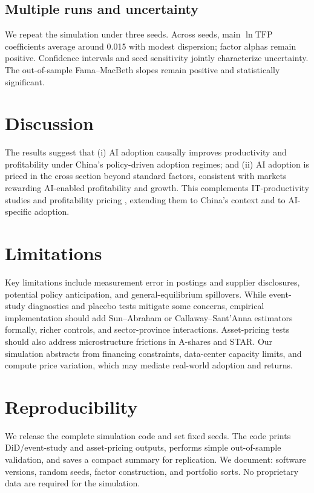 \subsection{Multiple runs and uncertainty}
We repeat the simulation under three seeds. Across seeds, main $\ln \mathrm{TFP}$ coefficients average around 0.015 with modest dispersion; factor alphas remain positive. Confidence intervals and seed sensitivity jointly characterize uncertainty. The out-of-sample Fama–MacBeth slopes remain positive and statistically significant.

\section{Discussion}
The results suggest that (i) AI adoption causally improves productivity and profitability under China’s policy-driven adoption regimes; and (ii) AI adoption is priced in the cross section beyond standard factors, consistent with markets rewarding AI-enabled profitability and growth. This complements IT-productivity studies \citep{BrynjolfssonHitt2000, Bloom2012} and profitability pricing \citep{NovyMarx2013}, extending them to China’s context and to AI-specific adoption.

\section{Limitations}
Key limitations include measurement error in postings and supplier disclosures, potential policy anticipation, and general-equilibrium spillovers. While event-study diagnostics and placebo tests mitigate some concerns, empirical implementation should add Sun–Abraham or Callaway–Sant’Anna estimators formally, richer controls, and sector-province interactions. Asset-pricing tests should also address microstructure frictions in A-shares and STAR. Our simulation abstracts from financing constraints, data-center capacity limits, and compute price variation, which may mediate real-world adoption and returns.

\section{Reproducibility}
We release the complete simulation code and set fixed seeds. The code prints DiD/event-study and asset-pricing outputs, performs simple out-of-sample validation, and saves a compact summary for replication. We document: software versions, random seeds, factor construction, and portfolio sorts. No proprietary data are required for the simulation.

